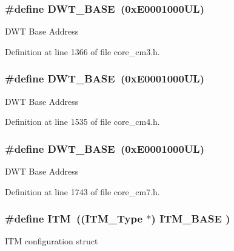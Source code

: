 \subsubsection[{\texorpdfstring{D\+W\+T\+\_\+\+B\+A\+SE}{DWT_BASE}}]{\setlength{\rightskip}{0pt plus 5cm}\#define D\+W\+T\+\_\+\+B\+A\+SE~(0x\+E0001000\+U\+L)}\hypertarget{group___c_m_s_i_s__core__base_gafdab534f961bf8935eb456cb7700dcd2}{}\label{group___c_m_s_i_s__core__base_gafdab534f961bf8935eb456cb7700dcd2}
D\+WT Base Address 

Definition at line 1366 of file core\+\_\+cm3.\+h.

\subsubsection[{\texorpdfstring{D\+W\+T\+\_\+\+B\+A\+SE}{DWT_BASE}}]{\setlength{\rightskip}{0pt plus 5cm}\#define D\+W\+T\+\_\+\+B\+A\+SE~(0x\+E0001000\+U\+L)}\hypertarget{group___c_m_s_i_s__core__base_gafdab534f961bf8935eb456cb7700dcd2}{}\label{group___c_m_s_i_s__core__base_gafdab534f961bf8935eb456cb7700dcd2}
D\+WT Base Address 

Definition at line 1535 of file core\+\_\+cm4.\+h.

\subsubsection[{\texorpdfstring{D\+W\+T\+\_\+\+B\+A\+SE}{DWT_BASE}}]{\setlength{\rightskip}{0pt plus 5cm}\#define D\+W\+T\+\_\+\+B\+A\+SE~(0x\+E0001000\+U\+L)}\hypertarget{group___c_m_s_i_s__core__base_gafdab534f961bf8935eb456cb7700dcd2}{}\label{group___c_m_s_i_s__core__base_gafdab534f961bf8935eb456cb7700dcd2}
D\+WT Base Address 

Definition at line 1743 of file core\+\_\+cm7.\+h.

\subsubsection[{\texorpdfstring{I\+TM}{ITM}}]{\setlength{\rightskip}{0pt plus 5cm}\#define I\+TM~(({\bf I\+T\+M\+\_\+\+Type}       $\ast$)     {\bf I\+T\+M\+\_\+\+B\+A\+SE}      )}\hypertarget{group___c_m_s_i_s__core__base_gabae7cdf882def602cb787bb039ff6a43}{}\label{group___c_m_s_i_s__core__base_gabae7cdf882def602cb787bb039ff6a43}
I\+TM configuration struct 

